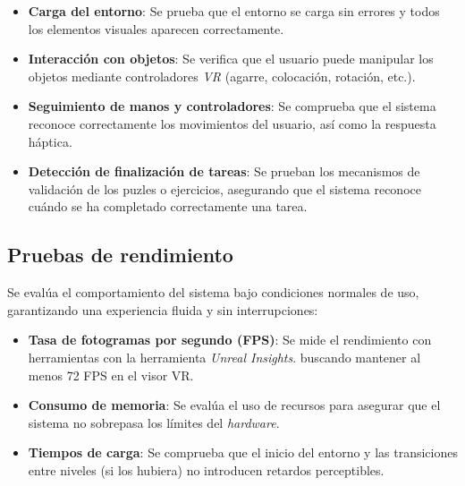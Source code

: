 \begin{itemize}
    \item \textbf{Carga del entorno}: Se prueba que el entorno se carga sin errores y todos los elementos visuales aparecen correctamente.
    
    \item \textbf{Interacción con objetos}: Se verifica que el usuario puede manipular los objetos mediante controladores \textit{VR} (agarre, colocación, rotación, etc.).
    
    \item \textbf{Seguimiento de manos y controladores}: Se comprueba que el sistema reconoce correctamente los movimientos del usuario, así como la respuesta háptica.
    
    \item \textbf{Detección de finalización de tareas}: Se prueban los mecanismos de validación de los puzles o ejercicios, asegurando que el sistema reconoce cuándo se ha completado correctamente una tarea.
    
\end{itemize}

\subsection{Pruebas de rendimiento}

Se evalúa el comportamiento del sistema bajo condiciones normales de uso, garantizando una experiencia fluida y sin interrupciones:

\begin{itemize}
    \item \textbf{Tasa de fotogramas por segundo (FPS)}: Se mide el rendimiento con herramientas con la herramienta \textit{Unreal Insights}. buscando mantener al menos 72 FPS en el visor VR.
    \item \textbf{Consumo de memoria}: Se evalúa el uso de recursos para asegurar que el sistema no sobrepasa los límites del \textit{hardware}.
    
    \item \textbf{Tiempos de carga}: Se comprueba que el inicio del entorno y las transiciones entre niveles (si los hubiera) no introducen retardos perceptibles.
\end{itemize}


